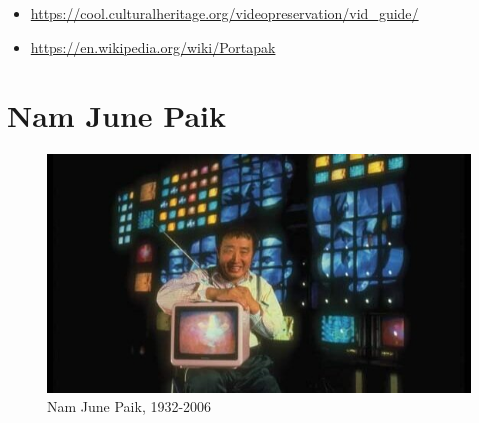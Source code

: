 \documentclass[
  french,
]{book}
\providecommand{\tightlist}{%
  \setlength{\itemsep}{0pt}\setlength{\parskip}{0pt}}
\begin{document}
\begin{itemize}
\tightlist
\item
  \url{https://cool.culturalheritage.org/videopreservation/vid_guide/}
\item
  \url{https://en.wikipedia.org/wiki/Portapak}
\end{itemize}

\hypertarget{nam-june-paik}{%
\section{Nam June Paik}\label{nam-june-paik}}

\begin{figure}
\centering
\includegraphics{medias/corpus/paik/paik_10.jpg}
\caption{Nam June Paik, 1932-2006}
\end{figure}
\end{document}
